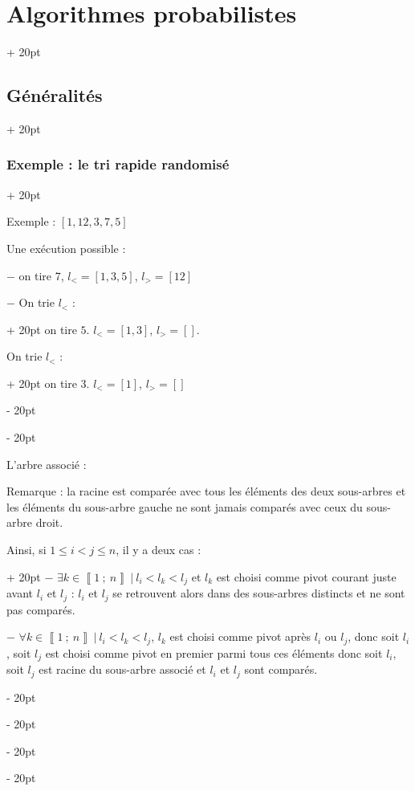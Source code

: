 \documentclass[a4paper, 12pt, twoside]{article}
\newcommand{\nset}[2]{\left\llbracket #1\ ;\ #2 \right\rrbracket}
\renewcommand{\le}{\leqslant}
\newcommand{\ind}[1][20pt]{\advance\leftskip + #1}
\newcommand{\deind}[1][20pt]{\advance\leftskip - #1}
\newenvironment{indt}[2][20pt]{#2 \par \ind[#1]}{\par \deind} %
\newcommand{\1}{\mathbbm 1}
\begin{document}
\begin{indt}{\section{Algorithmes probabilistes}}
\begin{indt}{\subsection{Généralités}}
\begin{indt}{\subsubsection{Exemple : le tri rapide randomisé}}
                \vspace{12pt}
                
                Exemple : $[1, 12, 3, 7, 5]$

                Une exécution possible :

                $-$ on tire 7, $l_< = [1, 3, 5]$, $l_> = [12]$

                \begin{indt}{$-$ On trie $l_<$ :}
                    on tire $5$. $l_< = [1, 3]$, $l_> = []$.

                    \begin{indt}{On trie $l_<$ :}
                        on tire 3. $l_< = [1]$, $l_> = []$
                    \end{indt}
                \end{indt}

                L'arbre associé :
                \begin{center}
                \end{center}

                Remarque : la racine est comparée avec tous les éléments des deux sous-arbres et les éléments du sous-arbre gauche ne sont jamais comparés avec ceux du sous-arbre droit.

                \begin{indt}{Ainsi, si $1 \le i < j \le n$, il y a deux cas :}
                    $-$ $\exists k \in \nset 1 n\ |\ l_i < l_k < l_j$ et $l_k$ est choisi comme pivot courant juste avant $l_i$ et $l_j$ : $l_i$ et $l_j$ se retrouvent alors dans des sous-arbres distincts et ne sont pas comparés.

                    $-$ $\forall k \in \nset 1 n\ |\ l_i < l_k < l_j$, $l_k$ est choisi comme pivot après $l_i$ ou $l_j$, donc soit $l_i$, soit $l_j$ est choisi comme pivot en premier parmi tous ces éléments donc soit $l_i$, soit $l_j$ est racine du sous-arbre associé et $l_i$ et $l_j$ sont comparés.
                \end{indt}


\end{indt}
\end{indt}
\end{indt}
\end{document}
